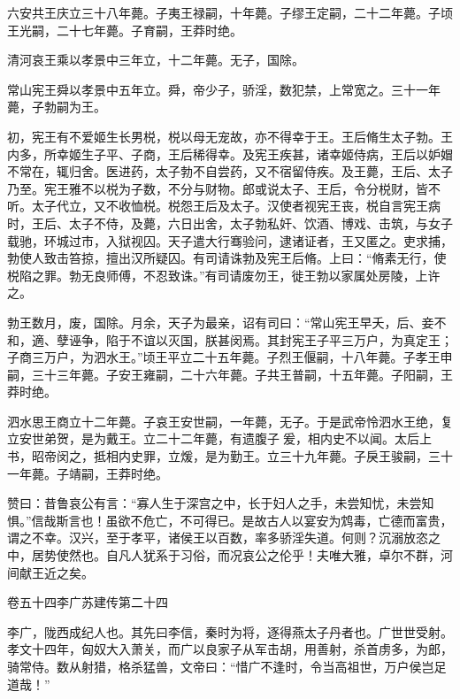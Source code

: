 \documentclass[12pt,UTF8]{ctexbook}
\begin{document}
六安共王庆立三十八年薨。子夷王禄嗣，十年薨。子缪王定嗣，二十二年薨。子顷王光嗣，二十七年薨。子育嗣，王莽时绝。



清河哀王乘以孝景中三年立，十二年薨。无子，国除。



常山宪王舜以孝景中五年立。舜，帝少子，骄淫，数犯禁，上常宽之。三十一年薨，子勃嗣为王。



初，宪王有不爱姬生长男棁，棁以母无宠故，亦不得幸于王。王后脩生太子勃。王内多，所幸姬生子平、子商，王后稀得幸。及宪王疾甚，诸幸姬侍病，王后以妒媢不常在，辄归舍。医进药，太子勃不自尝药，又不宿留侍疾。及王薨，王后、太子乃至。宪王雅不以棁为子数，不分与财物。郎或说太子、王后，令分棁财，皆不听。太子代立，又不收恤棁。棁怨王后及太子。汉使者视宪王丧，棁自言宪王病时，王后、太子不侍，及薨，六日出舍，太子勃私奸、饮酒、博戏、击筑，与女子载驰，环城过市，入狱视囚。天子遣大行骞验问，逮诸证者，王又匿之。吏求捕，勃使人致击笞掠，擅出汉所疑囚。有司请诛勃及宪王后脩。上曰：“脩素无行，使棁陷之罪。勃无良师傅，不忍致诛。”有司请废勿王，徙王勃以家属处房陵，上许之。



勃王数月，废，国除。月余，天子为最亲，诏有司曰：“常山宪王早夭，后、妾不和，適、孽诬争，陷于不谊以灭国，朕甚闵焉。其封宪王子平三万户，为真定王；子商三万户，为泗水王。”顷王平立二十五年薨。子烈王偃嗣，十八年薨。子孝王申嗣，三十三年薨。子安王雍嗣，二十六年薨。子共王普嗣，十五年薨。子阳嗣，王莽时绝。



泗水思王商立十二年薨。子哀王安世嗣，一年薨，无子。于是武帝怜泗水王绝，复立安世弟贺，是为戴王。立二十二年薨，有遗腹子爰，相内史不以闻。太后上书，昭帝闵之，抵相内史罪，立煖，是为勤王。立三十九年薨。子戾王骏嗣，三十一年薨。子靖嗣，王莽时绝。



赞曰：昔鲁哀公有言：“寡人生于深宫之中，长于妇人之手，未尝知忧，未尝知惧。”信哉斯言也！虽欲不危亡，不可得已。是故古人以宴安为鸩毒，亡德而富贵，谓之不幸。汉兴，至于孝平，诸侯王以百数，率多骄淫失道。何则？沉溺放恣之中，居势使然也。自凡人犹系于习俗，而况哀公之伦乎！夫唯大雅，卓尔不群，河间献王近之矣。





卷五十四李广苏建传第二十四



李广，陇西成纪人也。其先曰李信，秦时为将，逐得燕太子丹者也。广世世受射。孝文十四年，匈奴大入萧关，而广以良家子从军击胡，用善射，杀首虏多，为郎，骑常侍。数从射猎，格杀猛兽，文帝曰：“惜广不逢时，令当高祖世，万户侯岂足道哉！”
\end{document}

